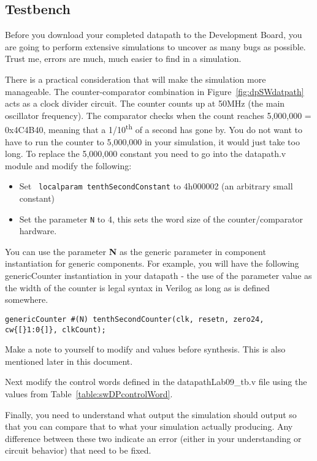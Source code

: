 \subsection{Testbench}

Before you download your completed datapath to the Development Board,
you are going to perform extensive simulations to uncover as many bugs
as possible. Trust me, errors are much, much easier to find in a
simulation.

There is a practical consideration that will make the simulation more
manageable. The counter-comparator combination in Figure~\ref{fig:dpSWdatpath} acts as a
clock divider circuit. The counter counts up at 50MHz (the main
oscillator frequency). The comparator checks when the count reaches
5,000,000 = 0x4C4B40, meaning that a 1/10\textsuperscript{th} of a
second has gone by. You do not want to have to run the counter to
5,000,000 in your simulation, it would just take too long. To replace
the 5,000,000 constant you need to go into the datapath.v module and
modify the following:

\begin{itemize}
\item
Set \verb+ localparam tenthSecondConstant+ to 4\textquotesingle h000002
  (an arbitrary small constant)
\item
  Set the parameter \verb+N+ to 4, this sets the word size of the counter/comparator hardware.
\end{itemize}

You can use the parameter \textbf{N} as the generic parameter in
component instantiation for generic components. For example, 
you will have the following genericCounter instantiation in your 
datapath - the use of the parameter value  as the width of the 
counter is legal syntax in Verilog as long as  is defined somewhere.

\begin{verbatim}
genericCounter #(N) tenthSecondCounter(clk, resetn, zero24, cw{[}1:0{]}, clkCount);
\end{verbatim}

Make a note to yourself to modify  and
 values before synthesis. This is also
mentioned later in this document.

Next modify the control words defined in the datapathLab09\_tb.v file
using the values from Table~\ref{table:swDPcontrolWord}.

Finally, you need to understand what output the simulation should output
so that you can compare that to what your simulation actually producing.
Any difference between these two indicate an error (either in your
understanding or circuit behavior) that need to be fixed.

